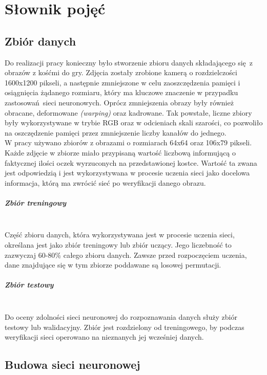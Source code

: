 
\chapter{Słownik pojęć}
\section{Zbiór danych}
Do realizacji pracy konieczny było stworzenie zbioru danych składającego się z obrazów
z kośćmi do gry. Zdjęcia zostały zrobione kamerą o rozdzielczości 1600x1200 pikseli,
a następnie zmniejszone w celu zaoszczędzenia pamięci i osiągnięcia żądanego rozmiaru,
który ma kluczowe znaczenie w przypadku zastosowań sieci neuronowych.
Oprócz zmniejszenia obrazy były również obracane, deformowane \textit{(warping)} oraz kadrowane.
Tak powstałe, liczne zbiory były wykorzystywane w trybie RGB oraz w odcieniach skali szarości,
co pozwoliło na oszczędzenie pamięci przez zmniejszenie liczby kanałów do jednego.\\
W pracy używano zbiorów z obrazami o rozmiarach 64x64 oraz 106x79 pikseli. Każde zdjęcie
w zbiorze miało przypisaną wartość liczbową informującą o faktycznej ilości oczek wyrzuconych
na przedstawionej kostce. Wartość ta zwana jest odpowiedzią i jest wykorzystywana w
procesie uczenia sieci jako docelowa informacja, którą ma zwrócić sieć po weryfikacji danego obrazu.

\paragraph{Zbiór treningowy} \mbox{}\\
Część zbioru danych, która wykorzystywana jest w procesie uczenia sieci, określana jest jako zbiór
treningowy lub zbiór uczący. Jego liczebność to zazwyczaj 60-80\% całego zbioru danych.
Zawsze przed rozpoczęciem uczenia, dane znajdujące się w tym zbiorze poddawane są losowej permutacji.

\paragraph{Zbiór testowy} \mbox{}\\
Do oceny zdolności sieci neuronowej do rozpoznawania danych służy zbiór testowy lub
walidacyjny. Zbiór jest rozdzielony od treningowego, by podczas weryfikacji sieci operowano
na nieznanych jej wcześniej danych.

\section{Budowa sieci neuronowej}
